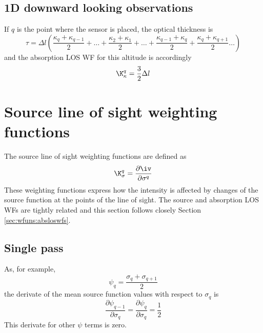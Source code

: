  \subsection{1D downward looking observations}
 If $q$ is the point where the sensor is placed, the optical thickness
 is
 \begin{equation}
   \tau = \Delta l \left( \frac{\kappa_q+\kappa_{q-1}}{2} + \dots+
                          \frac{\kappa_2+\kappa_1}{2} + \dots +
                          \frac{\kappa_{q-1}+\kappa_q}{2} +
                          \frac{\kappa_q+\kappa_{q+1}}{2} \dots \right)
 \end{equation}
 and the absorption LOS WF for this altitude is accordingly
 \begin{equation}
   \K_{\kappa}^q =  \frac{3}{2} \Delta l
 \end{equation}





\section{Source line of sight weighting functions}
 \label{sec:wfuns:sourceloswfs}

 The source line of sight weighting functions are defined as
 \begin{equation}
   \K_{\sigma}^q =  \frac{\partial\iv}{\partial \sigma^q}
  \label{eq:wfuns:sloswfs}
 \end{equation}
 These weighting functions express how the intensity is affected by
 changes of the source function at the points of the line of sight.
 The source and absorption LOS WFs are tightly related and this
 section follows closely Section \ref{sec:wfuns:absloswfs}.


 \subsection{Single pass}
  \label{sec:wfuns:single2}
  As, for example,
  \begin{equation}
    \psi_{q} = \frac{\sigma_q+\sigma_{q+1}}{2}
  \end{equation}
  the derivate of the mean source function values with respect to 
  $\sigma_q$ is
  \begin{equation}
    \frac{\partial \psi_{q-1}}{\partial \sigma_q} = 
    \frac{\partial \psi_q}{\partial \sigma_q} = \frac{1}{2}
   \label{eq:wfuns:dpsi}
  \end{equation}
  This derivate for other $\psi$ terms is zero.
 
